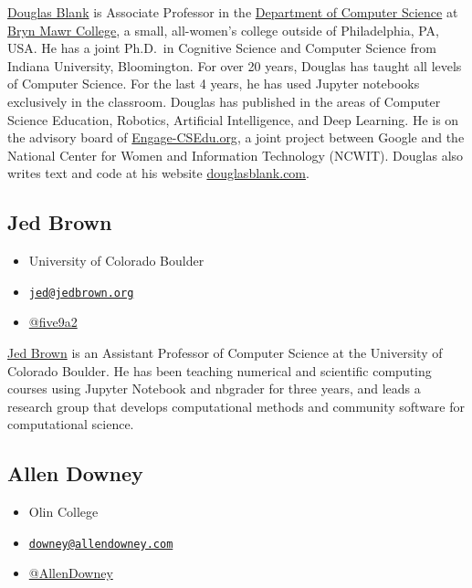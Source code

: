 \documentclass[]{book}
\providecommand{\tightlist}{%
  \setlength{\itemsep}{0pt}\setlength{\parskip}{0pt}}
\begin{document}
\href{https://cs.brynmawr.edu/~dblank/}{Douglas Blank} is Associate
Professor in the \href{https://cs.brynmawr.edu/}{Department of Computer
Science} at \href{http://brynmawr.edu/}{Bryn Mawr College}, a small,
all-women's college outside of Philadelphia, PA, USA. He has a joint
Ph.D.~in Cognitive Science and Computer Science from Indiana University,
Bloomington. For over 20 years, Douglas has taught all levels of
Computer Science. For the last 4 years, he has used Jupyter notebooks
exclusively in the classroom. Douglas has published in the areas of
Computer Science Education, Robotics, Artificial Intelligence, and Deep
Learning. He is on the advisory board of
\href{https://www.engage-csedu.org}{Engage-CSEdu.org}, a joint project
between Google and the National Center for Women and Information
Technology (NCWIT). Douglas also writes text and code at his website
\href{http://douglasblank.com}{douglasblank.com}.

\subsection{Jed Brown}\label{jed-brown}

\begin{itemize}
\tightlist
\item
  University of Colorado Boulder
\item
  \href{mailto:jed@jedbrown.org}{\nolinkurl{jed@jedbrown.org}}
\item
  \href{https://twitter.com/five9a2}{@five9a2}
\end{itemize}

\href{https://jedbrown.org/}{Jed Brown} is an Assistant Professor of
Computer Science at the University of Colorado Boulder. He has been
teaching numerical and scientific computing courses using Jupyter
Notebook and nbgrader for three years, and leads a research group that
develops computational methods and community software for computational
science.

\subsection{Allen Downey}\label{allen-downey}

\begin{itemize}
\tightlist
\item
  Olin College
\item
  \href{mailto:downey@allendowney.com}{\nolinkurl{downey@allendowney.com}}
\item
  \href{https://twitter.com/AllenDowney}{@AllenDowney}
\end{itemize}
\end{document}

